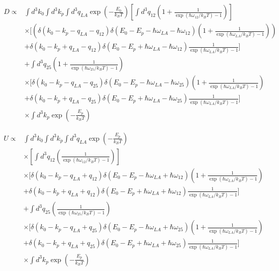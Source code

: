 \begin{align}
D \propto & \int d^3k_0 \int d^3k_p \int d^3q_{LA} \exp\left( -\frac{E_0}{k_B T} \right) 
\left[ \int d^3q_{12} \left( 1 + \frac{1}{\exp(\hbar \omega_{12}/k_B T) - 1} \right) \right] \\
& \times \Bigg[ 
\left( \delta(k_0 - k_p - q_{LA} - q_{12}) \delta(E_0 - E_p - \hbar \omega_{LA} - \hbar \omega_{12}) 
\left( 1 + \frac{1}{\exp(\hbar \omega_{LA}/k_B T) - 1} \right) \right) \\
& + \delta(k_0 - k_p + q_{LA} - q_{12}) \delta(E_0 - E_p + \hbar \omega_{LA} - \hbar \omega_{12}) 
\frac{1}{\exp(\hbar \omega_{LA}/k_B T) - 1} \Bigg] \\
& + \int d^3q_{25} \left( 1 + \frac{1}{\exp(\hbar \omega_{25}/k_B T) - 1} \right) \\
& \times \Bigg[ 
\delta(k_0 - k_p - q_{LA} - q_{25}) \delta(E_0 - E_p - \hbar \omega_{LA} - \hbar \omega_{25}) 
\left( 1 + \frac{1}{\exp(\hbar \omega_{LA}/k_B T) - 1} \right) \\
& + \delta(k_0 - k_p + q_{LA} - q_{25}) \delta(E_0 - E_p + \hbar \omega_{LA} - \hbar \omega_{25}) 
\frac{1}{\exp(\hbar \omega_{LA}/k_B T) - 1} \Bigg] \\
& \times \int d^3k_p \exp\left( -\frac{E_p}{k_B T} \right)
\end{align}

\begin{align}
U \propto & \int d^3k_0 \int d^3k_p \int d^3q_{LA} \exp\left( -\frac{E_p}{k_B T} \right) \\
& \times \left[ \int d^3q_{12} \left( \frac{1}{\exp(\hbar \omega_{12}/k_B T) - 1} \right) \right] \\
& \times \Bigg[ 
\delta(k_0 - k_p - q_{LA} + q_{12}) \delta(E_0 - E_p - \hbar \omega_{LA} + \hbar \omega_{12}) 
\left( 1 + \frac{1}{\exp(\hbar \omega_{LA}/k_B T) - 1} \right) \\
& + \delta(k_0 - k_p + q_{LA} + q_{12}) \delta(E_0 - E_p + \hbar \omega_{LA} + \hbar \omega_{12}) 
\frac{1}{\exp(\hbar \omega_{LA}/k_B T) - 1} \Bigg] \\
& + \int d^3q_{25} \left( \frac{1}{\exp(\hbar \omega_{25}/k_B T) - 1} \right) \\
& \times \Bigg[ 
\delta(k_0 - k_p - q_{LA} + q_{25}) \delta(E_0 - E_p - \hbar \omega_{LA} + \hbar \omega_{25}) 
\left( 1 + \frac{1}{\exp(\hbar \omega_{LA}/k_B T) - 1} \right) \\
& + \delta(k_0 - k_p + q_{LA} + q_{25}) \delta(E_0 - E_p + \hbar \omega_{LA} + \hbar \omega_{25}) 
\frac{1}{\exp(\hbar \omega_{LA}/k_B T) - 1} \Bigg] \\
& \times \int d^3k_p \exp\left( -\frac{E_p}{k_B T} \right)
\end{align}


